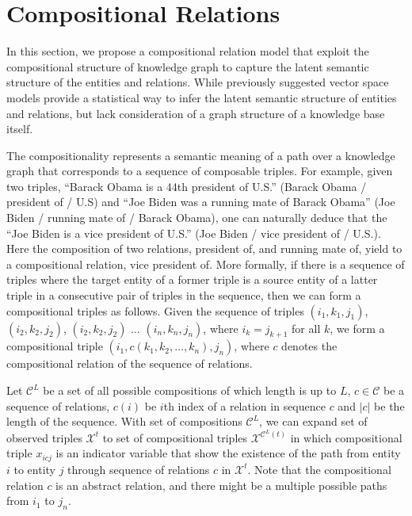\section{Compositional Relations}


In this section, we propose a compositional relation model that exploit the compositional structure of
knowledge graph to capture the latent semantic structure of the entities and relations.
While previously suggested vector space models provide a statistical way to infer the latent semantic
structure of entities and relations, but lack consideration of a graph structure of a knowledge base itself.

The compositionality represents a semantic meaning of a path over a knowledge graph that corresponds to a
sequence of composable triples.
For example, given two triples, ``Barack Obama is a 44th president of U.S.'' (Barack Obama / president of /
U.S) and ``Joe Biden was a running mate of Barack Obama'' (Joe Biden / running mate of / Barack Obama),
one can naturally deduce that the ``Joe Biden is a vice president of U.S.'' (Joe Biden / vice president of / U.S.).
Here the composition of two relations, president of, and running mate of, yield to a compositional relation,
vice president of.
More formally, if there is a sequence of triples where the target entity of a former triple is a source entity of a
latter triple in a consecutive pair of triples in the sequence, then we can form a compositional triples
as follows.
Given the sequence of triples
$(i_1, k_1 ,j_1)$,  $(i_2, k_2, j_2)$, $(i_2, k_2, j_2)$ $\dots$ $(i_n, k_n, j_n)$, where $i_k = j_{k+1}$ for all $k
$,  we form a compositional triple $(i_1, {c}(k_1, k_2, \dots, k_n), j_n)$, where $c$ denotes the compositional
relation of the sequence of relations.

Let $\mathcal{C}^{L}$ be a set of all possible compositions of which length is up to $L$, $c \in \mathcal{C}$
be a sequence of relations, $c(i)$ be $i$th index of a relation in sequence $c$ and $|c|$ be the length of the
sequence. With set of compositions $\mathcal{C}^{L}$, we can expand set of observed triples
$\mathcal{X}^{t}$ to set of compositional triples $\mathcal{X}^{\mathcal{C}^{L}(t)}$ in which
compositional triple $x_{icj}$ is an
indicator variable that show the existence of the path from entity $i$ to entity $j$ through sequence
of relations
$c$ in $\mathcal{X}^{t}$. Note that the compositional relation $c$ is an abstract relation, and there might be a
multiple possible paths from $i_1$ to $j_n$.


